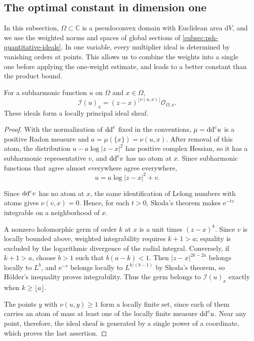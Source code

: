 \subsection{The optimal constant in dimension one}
\label{subsec:psh-planar-ideal-distance}

In this subsection, $\Omega\subset\mathbb C$ is a pseudoconvex domain with Euclidean area $\mathrm{d}V$, and we use the weighted norms and spaces of global sections of \cref{subsec:psh-quantitative-ideals}. In one variable, every multiplier ideal is determined by vanishing orders at points. This allows us to combine the weights into a single one before applying the one-weight estimate, and leads to a better constant than the product bound.

\begin{lemma}\label{lem:planar-multiplier-ideal}
For a subharmonic function $u$ on $\Omega$ and $x\in\Omega$,
\begin{equation}\label{eq:planar-multiplier-ideal}
 \mathcal I(u)_x=(z-x)^{\lfloor\nu(u,x)\rfloor}\mathcal O_{\Omega,x}.
\end{equation}
These ideals form a locally principal ideal sheaf.
\end{lemma}
\begin{proof}
With the normalization of $\mathrm{dd}^{\mathrm{c}}$ fixed in the conventions, $\mu=\mathrm{dd}^{\mathrm{c}} u$ is a positive Radon measure and $a=\mu(\{x\})=\nu(u,x)$. After removal of this atom, the distribution $u-a\log|z-x|^2$ has positive complex Hessian, so it has a subharmonic representative $v$, and $\mathrm{dd}^{\mathrm{c}} v$ has no atom at $x$. Since subharmonic functions that agree almost everywhere agree everywhere,
\[
 u=a\log|z-x|^2+v.
\]

Since $\mathrm{dd}^{\mathrm{c}} v$ has no atom at $x$, the same identification of Lelong numbers with atoms gives $\nu(v,x)=0$. Hence, for each $t>0$, Skoda's theorem \cite[Lemma~5.6]{DemAM11} makes $\mathrm e^{-tv}$ integrable on a neighborhood of $x$.

A nonzero holomorphic germ of order $k$ at $x$ is a unit times $(z-x)^k$. Since $v$ is locally bounded above, weighted integrability requires $k+1>a$; equality is excluded by the logarithmic divergence of the radial integral. Conversely, if $k+1>a$, choose $b>1$ such that $b(a-k)<1$. Then $|z-x|^{2k-2a}$ belongs locally to $L^b$, and $\mathrm e^{-v}$ belongs locally to $L^{b/(b-1)}$ by Skoda's theorem, so H\"older's inequality proves integrability. Thus the germ belongs to $\mathcal I(u)_x$ exactly when $k\geq\lfloor a\rfloor$.

The points $y$ with $\nu(u,y)\geq1$ form a locally finite set, since each of them carries an atom of mass at least one of the locally finite measure $\mathrm{dd}^{\mathrm{c}} u$. Near any point, therefore, the ideal sheaf is generated by a single power of a coordinate, which proves the last assertion.
\end{proof}

